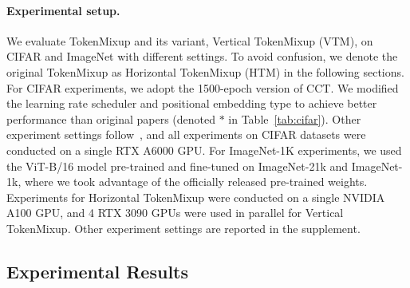 \documentclass{article}
\begin{document}
\paragraph{Experimental setup.}
We evaluate TokenMixup and its variant, Vertical TokenMixup (VTM), on CIFAR and ImageNet with different settings.
To avoid confusion, we denote the original TokenMixup as Horizontal TokenMixup (HTM) in the following sections.
For CIFAR experiments, we adopt the 1500-epoch version of CCT.
We modified the learning rate scheduler and positional embedding type to achieve better performance than original papers (denoted $*$ in Table~\ref{tab:cifar}).
Other experiment settings follow~\cite{hassani2021escaping}, and all experiments on CIFAR datasets were conducted on a single RTX A6000 GPU.
For ImageNet-1K experiments, we used the ViT-B/16 model pre-trained and fine-tuned on ImageNet-21k and ImageNet-1k, where we took advantage of the officially released pre-trained weights.
Experiments for Horizontal TokenMixup were conducted on a single NVIDIA A100 GPU, and 4 RTX 3090 GPUs were used in parallel for Vertical TokenMixup.
Other experiment settings are reported in the supplement.

\vspace{-2mm} 

\subsection{Experimental Results}
\vspace{1mm}
\end{document}
